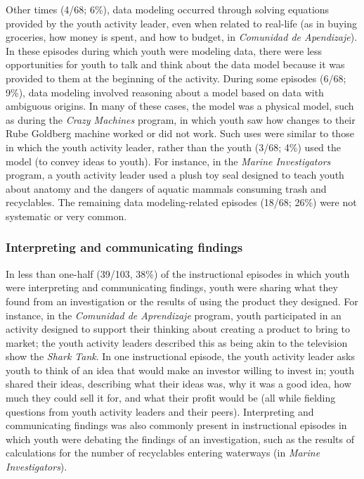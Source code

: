 \documentclass[]{msu-thesis}
\theoremstyle{definition}
\theoremstyle{definition}
\theoremstyle{definition}
\theoremstyle{remark}
\begin{document}
Other times (4/68; 6\%), data modeling occurred through solving
equations provided by the youth activity leader, even when related to
real-life (as in buying groceries, how money is spent, and how to
budget, in \emph{Comunidad de Apendizaje}). In these episodes during
which youth were modeling data, there were less opportunities for youth
to talk and think about the data model because it was provided to them
at the beginning of the activity. During some episodes (6/68; 9\%), data
modeling involved reasoning about a model based on data with ambiguous
origins. In many of these cases, the model was a physical model, such as
during the \emph{Crazy Machines} program, in which youth saw how changes
to their Rube Goldberg machine worked or did not work. Such uses were
similar to those in which the youth activity leader, rather than the
youth (3/68; 4\%) used the model (to convey ideas to youth). For
instance, in the \emph{Marine Investigators} program, a youth activity
leader used a plush toy seal designed to teach youth about anatomy and
the dangers of aquatic mammals consuming trash and recyclables. The
remaining data modeling-related episodes (18/68; 26\%) were not
systematic or very common.

\subsubsection{Interpreting and communicating
findings}\label{interpreting-and-communicating-findings}

In less than one-half (39/103, 38\%) of the instructional episodes in
which youth were interpreting and communicating findings, youth were
sharing what they found from an investigation or the results of using
the product they designed. For instance, in the \emph{Comunidad de
Aprendizaje} program, youth participated in an activity designed to
support their thinking about creating a product to bring to market; the
youth activity leaders described this as being akin to the television
show the \emph{Shark Tank}. In one instructional episode, the youth
activity leader asks youth to think of an idea that would make an
investor willing to invest in; youth shared their ideas, describing what
their ideas was, why it was a good idea, how much they could sell it
for, and what their profit would be (all while fielding questions from
youth activity leaders and their peers). Interpreting and communicating
findings was also commonly present in instructional episodes in which
youth were debating the findings of an investigation, such as the
results of calculations for the number of recyclables entering waterways
(in \emph{Marine Investigators}).
\end{document}
